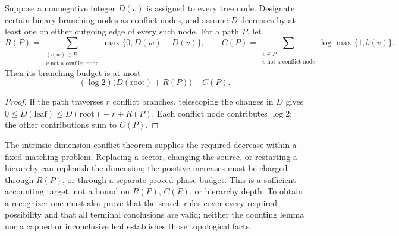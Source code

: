 \begin{corollary}
Suppose a nonnegative integer $D(v)$ is assigned to every tree node.
Designate certain binary branching nodes as conflict nodes, and assume
$D$ decreases by at least one on either outgoing edge of every such node.
For a path $P$, let
\[
 R(P)=\sum_{\substack{(v,w)\in P\\v\text{ not a conflict node}}}
       \max\{0,D(w)-D(v)\},\qquad
 C(P)=\sum_{\substack{v\in P\\v\text{ not a conflict node}}}
       \log\max\{1,b(v)\}.
\]
Then its branching budget is at most
\[
 (\log 2)\bigl(D(\mathrm{root})+R(P)\bigr)+C(P).
\]
\end{corollary}

\begin{proof}
If the path traverses $r$ conflict branches, telescoping the changes in
$D$ gives $0\leq D(\mathrm{leaf})\leq D(\mathrm{root})-r+R(P)$.
Each conflict node contributes $\log 2$; the other contributions sum to
$C(P)$.
\end{proof}

The intrinsic-dimension conflict theorem supplies the required decrease
within a fixed matching problem.  Replacing a sector, changing the source,
or restarting a hierarchy can replenish the dimension; the positive
increases must be charged through $R(P)$, or through a separate proved
phase budget.  This is a sufficient accounting target, not a bound on
$R(P)$, $C(P)$, or hierarchy depth.  To obtain a recognizer one must also
prove that the search rules cover every required possibility and that all
terminal conclusions are valid; neither the counting lemma nor a capped
or inconclusive leaf establishes those topological facts.
